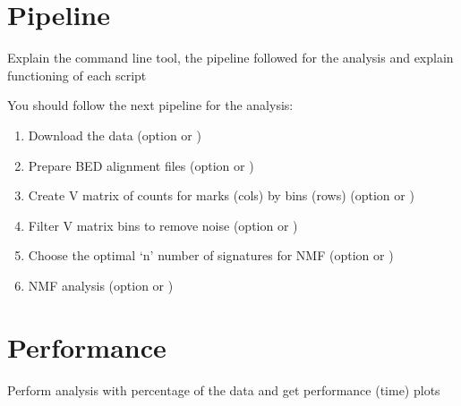 
\section{Pipeline}

Explain the command line tool, the pipeline followed for the analysis and explain functioning of each script

You should follow the next pipeline for the analysis:

\begin{enumerate}
    \item Download the data (option  or )
    \item Prepare BED alignment files (option  or )
    \item Create V matrix of counts for marks (cols) by bins (rows) (option  or )
    \item Filter V matrix bins to remove noise (option  or )
    \item Choose the optimal `n' number of signatures for NMF (option  or )
    \item NMF analysis (option  or )
\end{enumerate}

\section{Performance}

Perform analysis with percentage of the data and get performance (time) plots
